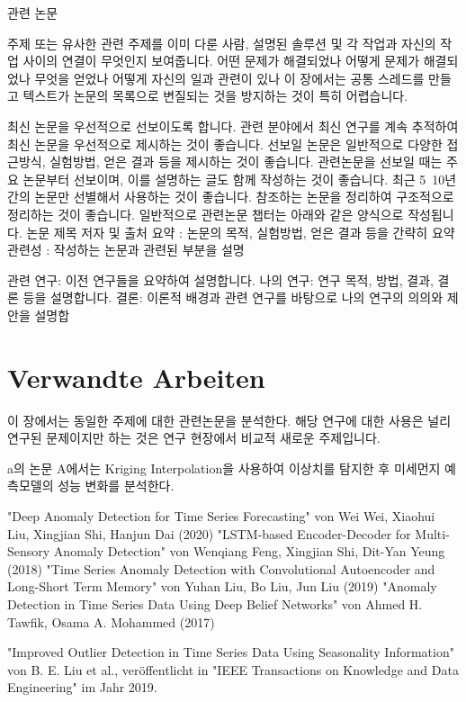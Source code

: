 관련 논문

주제 또는 유사한 관련 주제를 이미 다룬 사람, 설명된 솔루션 및 각 작업과 자신의 작업 사이의 연결이 무엇인지 보여줍니다.
어떤 문제가 해결되었나 어떻게 문제가 해결되었나 무엇을 얻었나 어떻게 자신의 일과 관련이 있나
이 장에서는 공통 스레드를 만들고 텍스트가 논문의 목록으로 변질되는 것을 방지하는 것이 특히 어렵습니다.

최신 논문을 우선적으로 선보이도록 합니다. 관련 분야에서 최신 연구를 계속 추적하여 최신 논문을 우선적으로 제시하는 것이 좋습니다.
선보일 논문은 일반적으로 다양한 접근방식, 실험방법, 얻은 결과 등을 제시하는 것이 좋습니다.
관련논문을 선보일 때는 주요 논문부터 선보이며, 이를 설명하는 글도 함께 작성하는 것이 좋습니다.
최근 5~10년간의 논문만 선별해서 사용하는 것이 좋습니다.
참조하는 논문을 정리하여 구조적으로 정리하는 것이 좋습니다.
일반적으로 관련논문 챕터는 아래와 같은 양식으로 작성됩니다.
논문 제목
저자 및 출처
요약 : 논문의 목적, 실험방법, 얻은 결과 등을 간략히 요약
관련성 : 작성하는 논문과 관련된 부분을 설명

관련 연구: 이전 연구들을 요약하여 설명합니다.
나의 연구: 연구 목적, 방법, 결과, 결론 등을 설명합니다.
결론: 이론적 배경과 관련 연구를 바탕으로 나의 연구의 의의와 제안을 설명합


\chapterpage\chapter{Verwandte Arbeiten}
    이 장에서는 동일한 주제에 대한 관련논문을 분석한다. 해당 연구에 대한 사용은 널리 연구된 문제이지만 하는 것은 연구 현장에서 비교적 새로운 주제입니다.
    
    a의 논문 A에서는 Kriging Interpolation을 사용하여 이상치를 탐지한 후 미세먼지 예측모델의 성능 변화를 분석한다.


    "Deep Anomaly Detection for Time Series Forecasting" von Wei Wei, Xiaohui Liu, Xingjian Shi, Hanjun Dai (2020)
    "LSTM-based Encoder-Decoder for Multi-Sensory Anomaly Detection" von Wenqiang Feng, Xingjian Shi, Dit-Yan Yeung (2018)
    "Time Series Anomaly Detection with Convolutional Autoencoder and Long-Short Term Memory" von Yuhan Liu, Bo Liu, Jun Liu (2019)
    "Anomaly Detection in Time Series Data Using Deep Belief Networks" von Ahmed H. Tawfik, Osama A. Mohammed (2017)
    
    "Improved Outlier Detection in Time Series Data Using Seasonality Information" von B. E. Liu et al., veröffentlicht in "IEEE Transactions on Knowledge and Data Engineering" im Jahr 2019.

